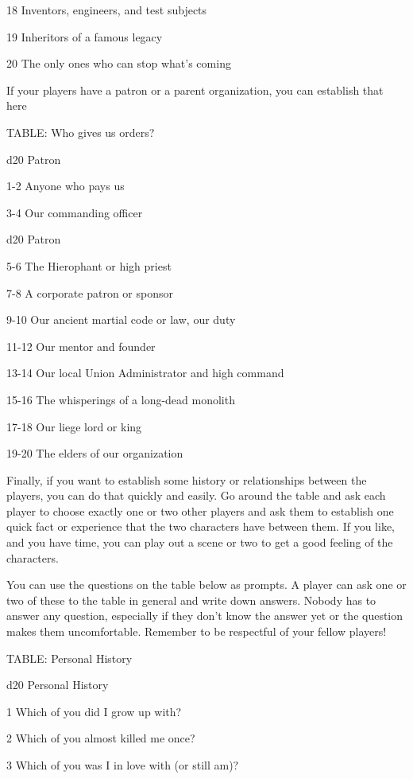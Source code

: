   18       Inventors, engineers, and test subjects

  19       Inheritors of a famous legacy

  20       The only ones who can stop what’s coming

If your players have a patron or a parent organization, you can establish that here


TABLE: Who gives us orders?


 d20       Patron

 1-2       Anyone who pays us

 3-4       Our commanding officer




 d20       Patron

 5-6       The Hierophant or high priest

 7-8       A corporate patron or sponsor

 9-10      Our ancient martial code or law, our duty

 11-12     Our mentor and founder

 13-14     Our local Union Administrator and high command

 15-16     The whisperings of a long-dead monolith

 17-18     Our liege lord or king

 19-20     The elders of our organization

Finally, if you want to establish some history or relationships between the players, you can do
that quickly and easily. Go around the table and ask each player to choose exactly one or two
other players and ask them to establish one quick fact or experience that the two characters
have between them. If you like, and you have time, you can play out a scene or two to get a
good feeling of the characters.


You can use the questions on the table below as prompts. A player can ask one or two of these
to the table in general and write down answers. Nobody has to answer any question, especially if
they don’t know the answer yet or the question makes them uncomfortable. Remember to be
respectful of your fellow players!


TABLE: Personal History

 d20       Personal	History

 1         Which of you did I grow up with?

 2         Which of you almost killed me once?

 3         Which of you was I in love with (or still am)?

